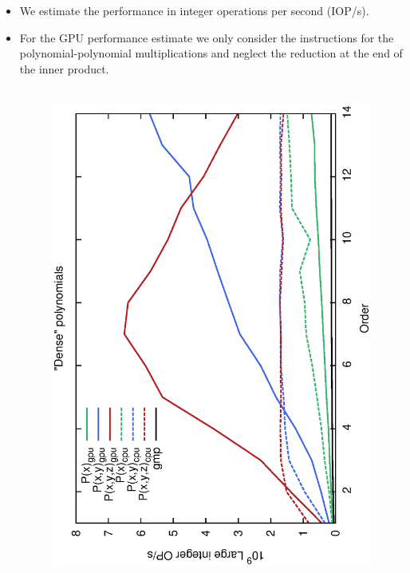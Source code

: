 \documentclass[oribibl,a4paper]{llncs2e/llncs}
\begin{document}
\begin{itemize}
\item We estimate the performance in integer operations per second (IOP/s).
\item For the GPU performance estimate we only consider the instructions for the polynomial-polynomial multiplications and neglect the reduction at the end of the inner product.
\begin{figure}[t!]
    \centering
    \mbox{
        \hspace{-0.5cm}
        \includegraphics[scale=0.37, angle=-90]{ME128.eps} 
}
\end{figure}
\end{itemize}
\end{document}
